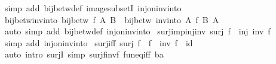 \begin{isabellebody}
\endisadelimproof
%
\isatagproof
{}\isamarkupfalse%
\ {\isacharparenleft}{\kern0pt}simp\ add{\isacharcolon}{\kern0pt}\ bij{\isacharunderscore}{\kern0pt}betw{\isacharunderscore}{\kern0pt}def\ image{\isacharunderscore}{\kern0pt}subsetI\ inj{\isacharunderscore}{\kern0pt}on{\isacharunderscore}{\kern0pt}inv{\isacharunderscore}{\kern0pt}into{\isacharparenright}{\kern0pt}%
\endisatagproof
{\isafoldproof}%
%
\isadelimproof
\isanewline
%
\endisadelimproof
\isanewline
{}\isamarkupfalse%
\ bij{\isacharunderscore}{\kern0pt}betw{\isacharunderscore}{\kern0pt}inv{\isacharunderscore}{\kern0pt}into{\isacharcolon}{\kern0pt}\ {\isachardoublequoteopen}bij{\isacharunderscore}{\kern0pt}betw\ f\ A\ B\ {\isasymLongrightarrow}\ bij{\isacharunderscore}{\kern0pt}betw\ {\isacharparenleft}{\kern0pt}inv{\isacharunderscore}{\kern0pt}into\ A\ f{\isacharparenright}{\kern0pt}\ B\ A{\isachardoublequoteclose}\isanewline
%
\isadelimproof
\ \ %
\endisadelimproof
%
\isatagproof
{}\isamarkupfalse%
\ {\isacharparenleft}{\kern0pt}auto\ simp\ add{\isacharcolon}{\kern0pt}\ bij{\isacharunderscore}{\kern0pt}betw{\isacharunderscore}{\kern0pt}def\ inj{\isacharunderscore}{\kern0pt}on{\isacharunderscore}{\kern0pt}inv{\isacharunderscore}{\kern0pt}into{\isacharparenright}{\kern0pt}%
\endisatagproof
{\isafoldproof}%
%
\isadelimproof
\isanewline
%
\endisadelimproof
\isanewline
{}\isamarkupfalse%
\ surj{\isacharunderscore}{\kern0pt}imp{\isacharunderscore}{\kern0pt}inj{\isacharunderscore}{\kern0pt}inv{\isacharcolon}{\kern0pt}\ {\isachardoublequoteopen}surj\ f\ {\isasymLongrightarrow}\ inj\ {\isacharparenleft}{\kern0pt}inv\ f{\isacharparenright}{\kern0pt}{\isachardoublequoteclose}\isanewline
%
\isadelimproof
\ \ %
\endisadelimproof
%
\isatagproof
{}\isamarkupfalse%
\ {\isacharparenleft}{\kern0pt}simp\ add{\isacharcolon}{\kern0pt}\ inj{\isacharunderscore}{\kern0pt}on{\isacharunderscore}{\kern0pt}inv{\isacharunderscore}{\kern0pt}into{\isacharparenright}{\kern0pt}%
\endisatagproof
{\isafoldproof}%
%
\isadelimproof
\isanewline
%
\endisadelimproof
\isanewline
{}\isamarkupfalse%
\ surj{\isacharunderscore}{\kern0pt}iff{\isacharcolon}{\kern0pt}\ {\isachardoublequoteopen}surj\ f\ {\isasymlongleftrightarrow}\ f\ {\isasymcirc}\ inv\ f\ {\isacharequal}{\kern0pt}\ id{\isachardoublequoteclose}\isanewline
%
\isadelimproof
\ \ %
\endisadelimproof
%
\isatagproof
{}\isamarkupfalse%
\ {\isacharparenleft}{\kern0pt}auto\ intro{\isacharbang}{\kern0pt}{\isacharcolon}{\kern0pt}\ surjI\ simp{\isacharcolon}{\kern0pt}\ surj{\isacharunderscore}{\kern0pt}f{\isacharunderscore}{\kern0pt}inv{\isacharunderscore}{\kern0pt}f\ fun{\isacharunderscore}{\kern0pt}eq{\isacharunderscore}{\kern0pt}iff{\isacharbrackleft}{\kern0pt}\ {\isacharprime}{\kern0pt}b{\isacharequal}{\kern0pt}{\isacharprime}{\kern0pt}a{\isacharbrackright}{\kern0pt}{\isacharparenright}{\kern0pt}%

\end{isabellebody}
